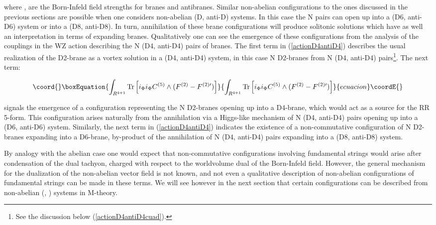 \documentclass[12pt,a4paper]{article}
\begin{document}
\noindent where \coordHE{}, \coordHE{} are the Born-Infeld
field strengths for branes and antibranes.
Similar non-abelian configurations to the ones discussed in the
previous sections
are possible when one considers 
non-abelian (D\coordHE{}, anti-D\coordHE{}) systems. In this case the N pairs can 
open up into
a (D6, anti-D6) system or into a (D8, anti-D8). 
In turn, annihilation of these
brane configurations will produce solitonic solutions which have as
well an interpretation in terms of expanding branes. 
Qualitatively one can see the emergence of these configurations
from the analysis of the couplings in the WZ action describing the
N (D4, anti-D4) pairs of branes. The first term in (\ref{actionD4antiD4})
describes the usual realization of the D2-brane as a vortex solution
in a (D4, anti-D4) system, in this case N D2-branes from N (D4, anti-D4)
pairs\footnote{See the discussion below (\ref{actionD4antiD4cuad}).}.
The next term: 

\begin{equation}\coord{}\boxEquation{
\int_{R^{4+1}}{\rm Tr}\left[i_\Phi i_\Phi C^{(5)}\wedge (F^{(2)}-
F^{(2)\prime})\right]
}{
\int_{R^{4+1}}{\rm Tr}\left[i_\Phi i_\Phi C^{(5)}\wedge (F^{(2)}-
F^{(2)\prime})\right]
}{ecuacion}\coordE{}\end{equation}

\noindent signals the emergence of a configuration representing the
N D2-branes opening up into a D4-brane, which would act as a source
for the RR 5-form. This configuration arises naturally from the 
annihilation via 
a Higgs-like mechanism of 
N (D4, anti-D4) pairs opening up into a (D6, anti-D6) system.
Similarly, the next term in (\ref{actionD4antiD4}) indicates the
existence of  
a non-commutative configuration of N D2-branes expanding into a
D6-brane, by-product of the annihilation of N (D4, anti-D4) pairs
expanding into a (D8, anti-D8) system. 

By analogy with the abelian case
one would expect that non-commutative configurations involving 
fundamental strings would arise after condensation of the
dual tachyon, charged with respect to the worldvolume dual of the
Born-Infeld field. However, the general mechanism for the dualization
of the non-abelian vector field is not known,
and not even a qualitative description
of non-abelian configurations of fundamental strings can be made
in these terms. We will see however in the next section that certain
configurations can be described from
non-abelian (\coordHE{}, \coordHE{}) systems in M-theory.
\end{document}
